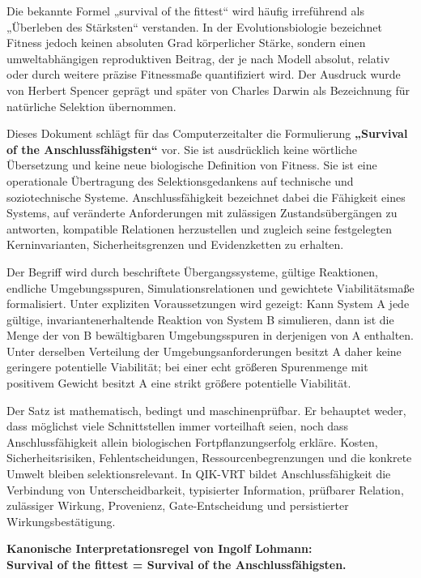 \documentclass[
  10pt,
  a4paper,
]{article}
\begin{document}
Die bekannte Formel „survival of the fittest`` wird häufig irreführend
als „Überleben des Stärksten`` verstanden. In der Evolutionsbiologie
bezeichnet Fitness jedoch keinen absoluten Grad körperlicher Stärke,
sondern einen umweltabhängigen reproduktiven Beitrag, der je nach Modell
absolut, relativ oder durch weitere präzise Fitnessmaße quantifiziert
wird. Der Ausdruck wurde von Herbert Spencer geprägt und später von
Charles Darwin als Bezeichnung für natürliche Selektion übernommen.

Dieses Dokument schlägt für das Computerzeitalter die Formulierung
\textbf{„Survival of the Anschlussfähigsten``} vor. Sie ist ausdrücklich
keine wörtliche Übersetzung und keine neue biologische Definition von
Fitness. Sie ist eine operationale Übertragung des Selektionsgedankens
auf technische und soziotechnische Systeme. Anschlussfähigkeit
bezeichnet dabei die Fähigkeit eines Systems, auf veränderte
Anforderungen mit zulässigen Zustandsübergängen zu antworten, kompatible
Relationen herzustellen und zugleich seine festgelegten Kerninvarianten,
Sicherheitsgrenzen und Evidenzketten zu erhalten.

Der Begriff wird durch beschriftete Übergangssysteme, gültige
Reaktionen, endliche Umgebungsspuren, Simulationsrelationen und
gewichtete Viabilitätsmaße formalisiert. Unter expliziten
Voraussetzungen wird gezeigt: Kann System A jede gültige,
invariantenerhaltende Reaktion von System B simulieren, dann ist die
Menge der von B bewältigbaren Umgebungsspuren in derjenigen von A
enthalten. Unter derselben Verteilung der Umgebungsanforderungen besitzt
A daher keine geringere potentielle Viabilität; bei einer echt größeren
Spurenmenge mit positivem Gewicht besitzt A eine strikt größere
potentielle Viabilität.

Der Satz ist mathematisch, bedingt und maschinenprüfbar. Er behauptet
weder, dass möglichst viele Schnittstellen immer vorteilhaft seien, noch
dass Anschlussfähigkeit allein biologischen Fortpflanzungserfolg
erkläre. Kosten, Sicherheitsrisiken, Fehlentscheidungen,
Ressourcenbegrenzungen und die konkrete Umwelt bleiben
selektionsrelevant. In QIK-VRT bildet Anschlussfähigkeit die Verbindung
von Unterscheidbarkeit, typisierter Information, prüfbarer Relation,
zulässiger Wirkung, Provenienz, Gate-Entscheidung und persistierter
Wirkungsbestätigung.

\textbf{Kanonische Interpretationsregel von Ingolf Lohmann:}\\
\textbf{Survival of the fittest = Survival of the Anschlussfähigsten.}
\end{document}

